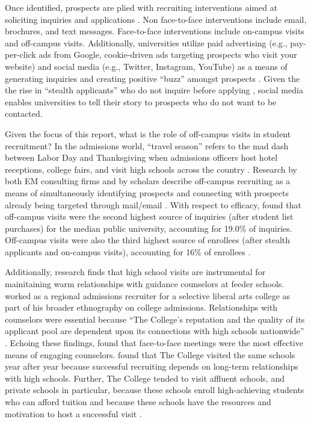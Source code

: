 \documentclass[twoside]{article}
\begin{document}
Once identified, prospects are plied with recruiting interventions aimed at soliciting inquiries and applications \citep{RN4323}. Non face-to-face interventions include email, brochures, and text messages.  Face-to-face interventions include on-campus visits and off-campus visits. Additionally, universities utilize paid advertising (e.g., pay-per-click ads from Google, cookie-driven ads targeting prospects who visit your website) and social media (e.g., Twitter, Instagram, YouTube) as a means of generating inquiries and creating positive ``buzz'' amongst prospects \citep{RN4134}. Given the the rise in ``stealth applicants'' who do not inquire before applying \citep{RN4411}, social media enables universities to tell their story to prospects who do not want to be contacted.

Given the focus of this report, what is the role of off-campus visits in student recruitment? In the admissions world, ``travel season'' refers to the mad dash between Labor Day and Thanksgiving when admissions officers host hotel receptions, college fairs, and visit high schools across the country \citep{RN3519}. Research by both EM consulting firms and by scholars describe off-campus recruiting as a means of simultaneously identifying prospects and connecting with prospects already being targeted through mail/email \citep[e.g., ][]{RN4323,RN4315,RN3519}. With respect to efficacy, \cite{RN4402} found that off-campus visits were the second highest source of inquiries (after student list purchases) for the median public university, accounting for 19.0\% of inquiries. Off-campus visits were also the third highest source of enrollees (after stealth applicants and on-campus visits), accounting for 16\% of enrollees \citep{RN4402}.


Additionally, research finds that high school visits are instrumental for mainitaining warm relationships with guidance counselors at feeder schools.  \cite{RN3519} worked as a regional admissions recruiter for a selective liberal arts college as part of his broader ethnography on college admissions.  Relationships with counselors were essential because ``The College's reputation and the quality of its applicant pool are dependent upon its connections with high schools nationwide'' \citep[p.~53]{RN3519}. Echoing these findings, \cite{RN4402} found that face-to-face meetings were the most effective means of engaging counselors.  \cite{RN3519} found that The College visited the same schools year after year because successful recruiting depends on long-term relationships with high schools. Further, The College tended to visit affluent schools, and private schools in particular, because these schools enroll high-achieving students who can afford tuition and because these schools have the resources and motivation to host a successful visit \citep{RN3519}.  
\end{document}
